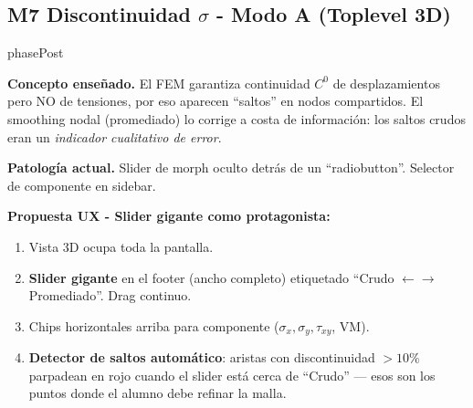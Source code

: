 \documentclass[11pt,a4paper]{article}
\begin{document}
\subsection{M7 \textbar{} Discontinuidad $\sigma$ - Modo A (Toplevel 3D)}

\begin{moduleBox}{phasePost}

\textbf{Concepto enseñado.} El FEM garantiza continuidad $C^0$ de
desplazamientos pero NO de tensiones, por eso aparecen ``saltos'' en
nodos compartidos. El smoothing nodal (promediado) lo corrige a costa
de información: los saltos crudos eran un \emph{indicador cualitativo
de error}.

\textbf{Patología actual.} Slider de morph oculto detrás de un
``radiobutton''. Selector de componente en sidebar.

\textbf{Propuesta UX - Slider gigante como protagonista:}
\begin{enumerate}[leftmargin=1.2em, itemsep=2pt]
  \item Vista 3D ocupa toda la pantalla.
  \item \textbf{Slider gigante} en el footer (ancho completo) etiquetado
        ``Crudo $\leftarrow$$\rightarrow$ Promediado''. Drag continuo.
  \item Chips horizontales arriba para componente ($\sigma_x, \sigma_y,
        \tau_{xy}$, VM).
  \item \textbf{Detector de saltos automático}: aristas con discontinuidad
        $> 10\%$ parpadean en rojo cuando el slider está cerca de ``Crudo''
        — esos son los puntos donde el alumno debe refinar la malla.
\end{enumerate}

\begin{center}
\end{center}
\end{moduleBox}
\end{document}
